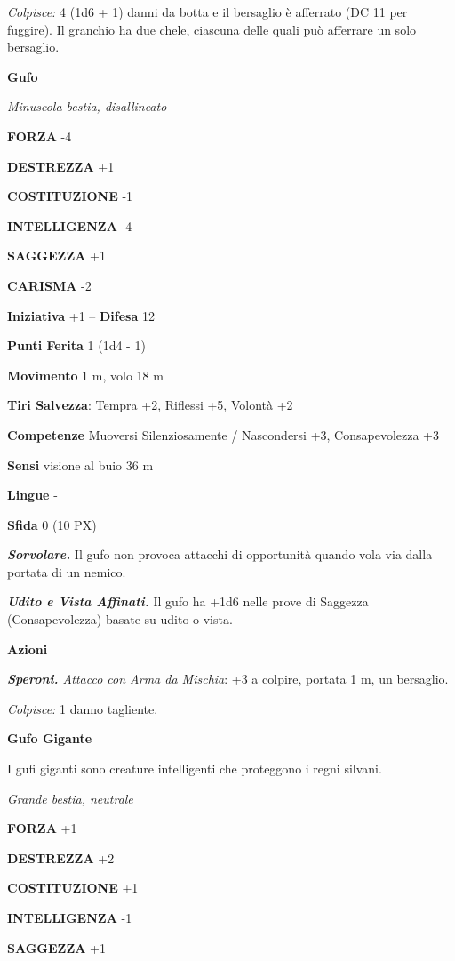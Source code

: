 \begin{multicols}{2}
	\textit{Colpisce:} 4 (1d6 + 1) danni da botta e il bersaglio è afferrato (DC 11 per fuggire). Il granchio ha due chele, ciascuna delle quali può afferrare un solo bersaglio.

	\medskip\textbf{Gufo}

	\textit{Minuscola bestia, disallineato}

	\textbf{FORZA} -4

	\textbf{DESTREZZA} +1

	\textbf{COSTITUZIONE} -1

	\textbf{INTELLIGENZA} -4

	\textbf{SAGGEZZA} +1

	\textbf{CARISMA} -2

	\textbf{Iniziativa} +1 -- \textbf{Difesa} 12

	\textbf{Punti Ferita} 1 (1d4 - 1)

	\textbf{Movimento} 1 m, volo 18 m

	\textbf{Tiri Salvezza}: Tempra +2, Riflessi +5, Volontà +2

	\textbf{Competenze} Muoversi Silenziosamente / Nascondersi +3, Consapevolezza +3

	\textbf{Sensi} visione al buio 36 m

	\textbf{Lingue} -

	\textbf{Sfida} 0 (10 PX)

	\textit{\textbf{Sorvolare.}} Il gufo non provoca attacchi di opportunità quando vola via dalla portata di un nemico.

	\textit{\textbf{Udito e Vista Affinati.}} Il gufo ha +1d6 nelle prove di Saggezza (Consapevolezza) basate su udito o vista.

	\textbf{Azioni}

	\textit{\textbf{Speroni.} Attacco con Arma da Mischia}: +3 a colpire, portata 1 m, un bersaglio.

	\textit{Colpisce:} 1 danno tagliente.

	\medskip\textbf{Gufo Gigante}

	I gufi giganti sono creature intelligenti che proteggono i regni silvani.

	\textit{Grande bestia, neutrale}

	\textbf{FORZA} +1

	\textbf{DESTREZZA} +2

	\textbf{COSTITUZIONE} +1

	\textbf{INTELLIGENZA} -1

	\textbf{SAGGEZZA} +1


\end{multicols}
